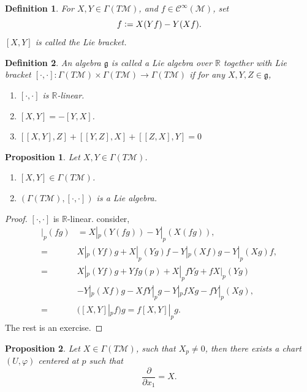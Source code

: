 \documentclass[8pt]{article}
\newtheorem{proposition}{Proposition}[section]
\newtheorem{definition}{Definition}[section]
\newcommand{\defeq}{\vcentcolon=}
\newcommand{\R}[0]{\mathbb{R}}
\newcommand{\M}[0]{\mathcal{M}}
\newcommand{\pd}[2]{{\frac {\partial #1} {\partial #2}}}
\begin{document}
\begin{definition}
  For $X,Y\in\Gamma(T\M)$, and $f\in\mathcal{C}^\infty(\M)$, set 
  \begin{equation*}
    [X,Y]f\defeq X(Yf) - Y(Xf).
  \end{equation*}
  $[X,Y]$ is called the Lie bracket. 
\end{definition}

\begin{definition}
  An algebra $\mathfrak{g}$ is called a Lie algebra over $\R$ together with Lie bracket $[\cdot,\cdot]:\Gamma(T\M)\times \Gamma(T\M)\to \Gamma(T\M)$ if for any $X,Y,Z\in\mathfrak{g}$,
  \begin{enumerate}
    \item $[\cdot,\cdot]$ is $\R$-linear.
    \item $[X,Y] = -[Y,X]$.
    \item $[[X,Y],Z]+[[Y,Z],X]+[[Z,X],Y] = 0$
  \end{enumerate}
\end{definition}

\begin{proposition}
  Let $X,Y\in\Gamma(T\M)$.
  \begin{enumerate}
    \item $[X,Y]\in\Gamma(T\M)$.
    \item $(\Gamma(T\M),[\cdot,\cdot])$ is a Lie algebra.
  \end{enumerate}
\end{proposition}

\begin{proof}
  $[\cdot,\cdot]$ is $\R$-linear. consider,
\begin{align*}
  [X,Y]|_p(fg) &= X|_p(Y(fg))-Y|_p(X(fg)),\\
   =& X|_p(Yf)g+X|_p(Yg)f - Y|_p(Xf)g-Y|_p(Xg)f,\\
   =& X|_p(Yf)g+Yfg(p)+X|_pf Yg+fX|_p(Yg) \\
  &- Y|_p(Xf)g-XfY|_pg-Y|_pfXg-fY|_p(Xg),\\
   =& ([X,Y]|_p f)g = f[X,Y]|_pg.
\end{align*}
The rest is an exercise.
\end{proof}

\begin{proposition}
  Let $X\in\Gamma(T\M)$, such that $X_p\not=0$, then there exists a chart $(U,\varphi)$ centered at $p$ such that 
  \begin{equation*}
    \pd{}{x_1} = X.
  \end{equation*}
\end{proposition}
\end{document}
